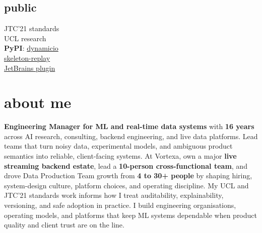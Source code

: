 \documentclass[]{../../../../friggeri-cv}
\begin{document}
\begin{aside}
			\section{public}
			{\footnotesize JTC'21 standards\\UCL research\\\textbf{PyPI}: \href{https://pypi.org/project/dynamicio/}{dynamicio}\\\href{https://pypi.org/project/skeleton-replay/}{skeleton-replay}\\\href{https://plugins.jetbrains.com/plugin/32807-skeleton-replay}{JetBrains plugin}}
	\end{aside}

\section{about me}
{\small \textbf{Engineering Manager for ML and real-time data systems} with \textbf{16 years} across AI research, consulting, backend engineering, and live data platforms. Lead teams that turn noisy data, experimental models, and ambiguous product semantics into reliable, client-facing systems. At Vortexa, own a major \textbf{live streaming backend estate}, lead a \textbf{10-person cross-functional team}, and drove Data Production Team growth from \textbf{4 to 30+ people} by shaping hiring, system-design culture, platform choices, and operating discipline. My UCL and JTC'21 standards work informs how I treat auditability, explainability, versioning, and safe adoption in practice. I build engineering organisations, operating models, and platforms that keep ML systems dependable when product quality and client trust are on the line.}
\end{document}
